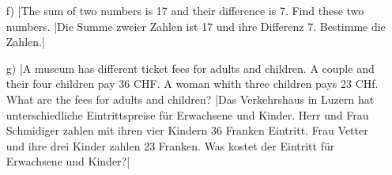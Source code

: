 \begin{exer}
\begin{itemize}
\vsp

\item[f)]  \tr|The sum of two numbers is 17 and their difference is 7. Find these two numbers. |Die Summe zweier Zahlen ist 17 und ihre Differenz 7. Bestimme die Zahlen.|

\vsp

\item[g)]
  \tr|A museum has different ticket fees for adults and children.  A couple and their four children pay 36 CHF. A woman whith three children pays 23 CHf. What are the fees for adults and children?
     |Das Verkehrshaus in Luzern hat unterschiedliche Eintrittspreise für Erwachsene und Kinder. Herr und Frau Schmidiger zahlen mit ihren vier Kindern 36 Franken Eintritt.
      Frau Vetter und ihre drei Kinder zahlen 23 Franken. Was kostet der Eintritt für Erwachsene und Kinder?|


\end{itemize}
\end{exer}

